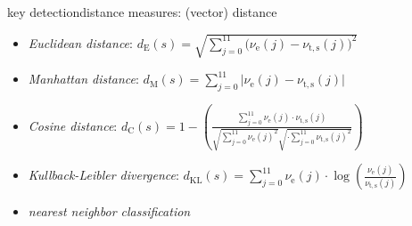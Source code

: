         \begin{frame}{key detection}{distance measures: (vector) distance}
            \begin{footnotesize}
                    \begin{itemize}
                        \item	\emph{{Euclidean distance}}:
                                $d_\mathrm{E}(s) = \sqrt{\sum\limits_{j = 0}^{11}{\big(\nu_\mathrm{e}(j)-\nu_\mathrm{t,s}(j)\big)^2}} $
                        \item<2->	\emph{{Manhattan distance}}:
                                $d_\mathrm{M}(s) = \sum\limits_{j = 0}^{11}{\big|\nu_\mathrm{e}(j)-\nu_\mathrm{t,s}(j)\big|} $
                        \item<3->	\emph{{Cosine distance}}:
                                $d_\mathrm{C}(s) = 1-\left( \frac{\sum\limits_{j = 0}^{11}{\nu_\mathrm{e}(j)\cdot\nu_\mathrm{t,s}(j)}}{\sqrt{\sum\limits_{j = 0}^{11}{\nu_\mathrm{e}(j)^2}}\sqrt{\cdot \sum\limits_{j = 0}^{11}{\nu_\mathrm{t,s}(j)^2}}}\right) $
                        \item<4->	\emph{{Kullback-Leibler divergence}}:
                                $d_\mathrm{KL}(s) = \sum\limits_{j = 0}^{11}{\nu_\mathrm{e}(j)\cdot\log\left(\frac{\nu_\mathrm{e}(j)}{\nu_\mathrm{t,s}(j)}\right)}$
                        \item<5->   \textit{nearest neighbor classification}
                    \end{itemize}
            \end{footnotesize}
        \end{frame}
